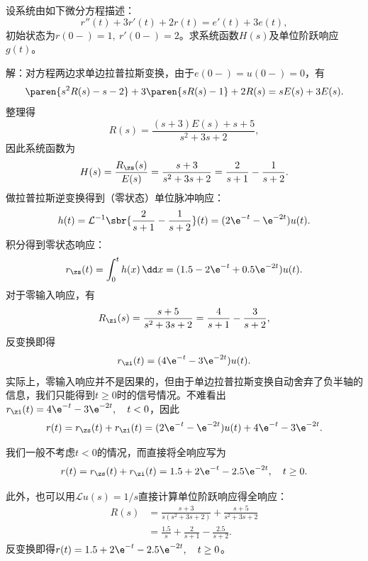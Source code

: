 \begin{example}[常系数线性微分方程]
    设系统由如下微分方程描述：
    \begin{equation}
        r''(t)+3r'(t)+2r(t)=e'(t)+3e(t),
    \end{equation}
    初始状态为$r(0-)=1,\ r'(0-)=2$。求系统函数$H(s)$及单位阶跃响应$g(t)$。

    解：对方程两边求单边拉普拉斯变换，由于$e(0-)=u(0-)=0$，有
    \begin{equation}
        \paren{s^2 R(s)-s-2}+3\paren{sR(s)-1}+2R(s)=sE(s)+3E(s).
    \end{equation}
    整理得
    \begin{equation}
        R(s)=\frac{(s+3)E(s)+s+5}{s^2+3s+2},
    \end{equation}
    因此系统函数为
    \begin{equation}
        H(s)=\frac{R_{\zs}(s)}{E(s)}=\frac{s+3}{s^2+3s+2}=\frac{2}{s+1}-\frac{1}{s+2}.
    \end{equation}
    做拉普拉斯逆变换得到（零状态）单位脉冲响应：
    \begin{equation}
        h(t)=\mathcal{L}^{-1}\sbr{\frac{2}{s+1}-\frac{1}{s+2}}(t)=(2\e^{-t}-\e^{-2t})u(t).
    \end{equation}
    积分得到零状态响应：
    \begin{equation}
        r_{\zs}(t)=\int_0^{t}h(x)\,\dd x=(1.5-2\e^{-t}+0.5\e^{-2t})u(t).
    \end{equation}
    对于零输入响应，有
    \begin{equation}
        R_{\zi}(s)=\frac{s+5}{s^2+3s+2}=\frac{4}{s+1}-\frac{3}{s+2},
    \end{equation}
    反变换即得
    \begin{equation}
        r_{\zi}(t)=(4\e^{-t}-3\e^{-2t})u(t).
    \end{equation}
    实际上，零输入响应并不是因果的，但由于单边拉普拉斯变换自动舍弃了负半轴的信息，我们只能得到$t\geq 0$时的信号情况。不难看出$r_{\zi}(t)=4\e^{-t}-3\e^{-2t},\quad t<0$，因此
    \begin{equation}
        r(t)=r_{\zs}(t)+r_{\zi}(t)=(2\e^{-t}-\e^{-2t})u(t)+4\e^{-t}-3\e^{-2t}.
    \end{equation}

    我们一般不考虑$t<0$的情况，而直接将全响应写为
    \begin{equation}
        r(t)=r_{\zs}(t)+r_{\zi}(t)=1.5+2\e^{-t}-2.5\e^{-2t},\quad t\geq 0.
    \end{equation}

    此外，也可以用$\mathcal{L}u(s)=1/s$直接计算单位阶跃响应得全响应：
    \begin{align}
        R(s)&=\frac{s+3}{s(s^2+3s+2)}+\frac{s+5}{s^2+3s+2}\nonumber\\
        &=\frac{1.5}{s}+\frac{2}{s+1}-\frac{2.5}{s+2}.
    \end{align}
    反变换即得$r(t)=1.5+2\e^{-t}-2.5\e^{-2t},\quad t\geq 0$。
\end{example}

